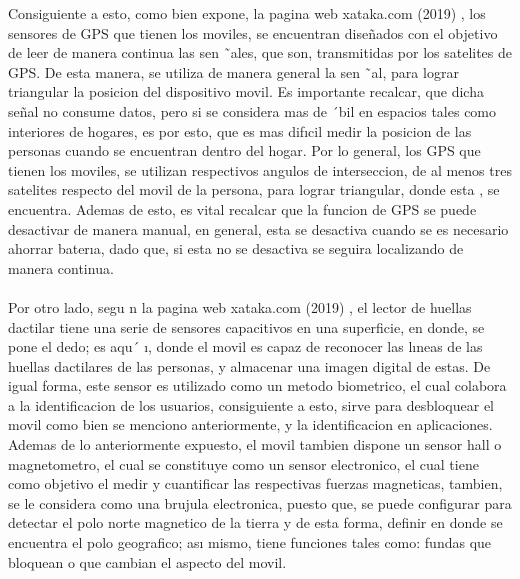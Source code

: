 \documentclass[conference,compsoc,onecolumn]{IEEEtran}
\begin{document}
Consiguiente  a  esto,  como  bien  expone,  la  pagina  web  xataka.com  (2019)  ,  los  sensores  de  GPS  que  tienen  los moviles,  se  encuentran  diseñados  con  el  objetivo  de  leer  de  manera  continua  las  sen ˜ales,  que  son,  transmitidas por  los  satelites  de  GPS.  De  esta  manera,  se  utiliza  de  manera  general  la  sen ˜al,  para  lograr  triangular  la  posicion del  dispositivo  movil.  Es  importante  recalcar,  que  dicha  señal  no  consume  datos,  pero  si  se  considera  mas  de ´bil en  espacios  tales  como  interiores  de  hogares,  es  por  esto,  que  es  mas  difıcil  medir  la  posicion  de  las  personas cuando  se  encuentran  dentro  del  hogar.  Por  lo  general,  los  GPS  que  tienen  los  moviles,  se  utilizan  respectivos angulos  de  interseccion,  de  al  menos  tres  satelites  respecto  del  movil  de  la  persona,  para  lograr  triangular,  donde esta , se encuentra. Ademas de esto, es vital recalcar que la funcion de GPS se puede desactivar de manera manual, en general, esta se desactiva cuando se es necesario ahorrar baterıa, dado que, si esta no se desactiva se seguira localizando de manera continua. 
\\
\\
Por  otro  lado,  segu n  la  pagina  web  xataka.com  (2019)  ,  el  lector  de  huellas  dactilar  tiene  una  serie  de  sensores capacitivos en una superficie, en donde, se pone el dedo; es aqu´ ı, donde el movil es capaz de reconocer las lıneas de las huellas dactilares de las personas, y almacenar una imagen digital de estas. De igual forma, este sensor es utilizado como un metodo biometrico, el cual colabora a la identificacion de los usuarios, consiguiente a esto, sirve 
para desbloquear el movil como bien se menciono  anteriormente, y la identificacion en aplicaciones. Ademas de lo anteriormente  expuesto,  el  movil  tambien  dispone  un  sensor  hall  o  magnetometro,  el  cual  se  constituye  como  un sensor electronico, el cual tiene como objetivo el medir y cuantificar las respectivas fuerzas magneticas, tambien, se le considera como una brujula electronica, puesto que, se puede configurar para detectar el polo norte magnetico de la tierra y de esta forma, definir en donde se encuentra el polo geografico; ası mismo, tiene funciones tales como: fundas que bloquean o que cambian el aspecto del movil.
\\
\\
\end{document}
